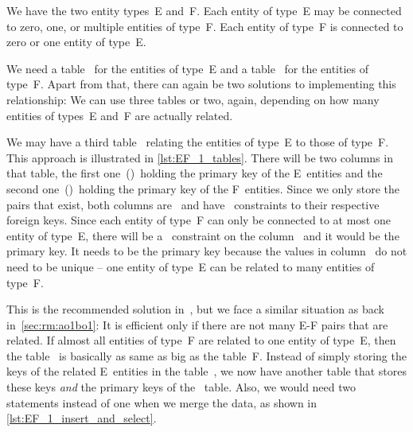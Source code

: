 %
%
%
%
%
%
%
We have the two entity types~E and~F.
Each entity of type~E may be connected to zero, one, or multiple entities of type~F.
Each entity of type~F is connected to zero or one entity of type~E.

We need a table~ for the entities of type~E and a table~ for the entities of type~F.
Apart from that, there can again be two solutions to implementing this relationship:
We can use three tables or two, again, depending on how many entities of types~E and~F are actually related.

We may have a third table~ relating the entities of type~E to those of type~F.
This approach is illustrated in \cref{lst:EF_1_tables}.
There will be two columns in that table, the first one~()~holding the primary key of the E~entities and the second one~()~holding the primary key of the F~entities.
Since we only store the pairs that exist, both columns are~ and have~ constraints to their respective foreign keys.
Since each entity of type~F can only be connected to at most one entity of type~E, there will be a~ constraint on the column~ and it would be the primary key.
It needs to be the primary key because the values in column~ do not need to be unique -- one entity of type~E can be related to many entities of type~F.

This is the recommended solution in~\cite{S2024D:MEDTRDM}, but we face a similar situation as back in~\cref{sec:rm:ao1bo1}:
It is efficient only if there are not many E\nobreakdashes-F pairs that are related.
If almost all entities of type~F are related to one entity of type~E, then the table~ is basically as same as big as the table~F.
Instead of simply storing the keys of the related E~entities in the table~, we now have another table that stores these keys \emph{and} the primary keys of the ~table.
Also, we would need two  statements instead of one when we merge the data, as shown in \cref{lst:EF_1_insert_and_select}.

